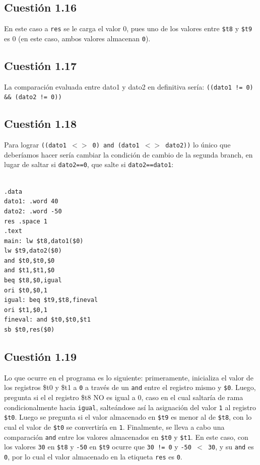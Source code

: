 \documentclass[11pt]{article}
\begin{document}
\begin{large}
\begin{flushleft}
\subsection*{Cuestión 1.16}
En este caso a \texttt{res} se le carga el valor 0, pues uno de los valores entre \texttt{\$t8} y \texttt{\$t9} es 0 (en este caso, ambos valores almacenan \texttt{0}).


\subsection*{Cuestión 1.17}
La comparación evaluada entre dato1 y dato2 en definitiva sería: \texttt{((dato1 != 0) \&\& (dato2 != 0))}

\subsection*{Cuestión 1.18}
Para lograr \texttt{((dato1 $<>$ 0) and (dato1 $<>$ dato2))} lo único que deberíamos hacer sería cambiar la condición de cambio de la segunda branch, en lugar de saltar si \texttt{dato2==0}, que salte si \texttt{dato2==dato1}:

\begin{listing}[h]
\begin{verbatim}

.data
dato1: .word 40
dato2: .word -50
res .space 1
.text
main: lw $t8,dato1($0)
lw $t9,dato2($0)
and $t0,$t0,$0
and $t1,$t1,$0
beq $t8,$0,igual
ori $t0,$0,1
igual: beq $t9,$t8,fineval
ori $t1,$0,1
fineval: and $t0,$t0,$t1
sb $t0,res($0)

\end{verbatim}
\end{listing}

\subsection*{Cuestión 1.19}
Lo que ocurre en el programa es lo siguiente: primeramente, inicializa el valor de los registros \$t0 y \$t1 a \texttt{0} a través de un \texttt{and} entre el registro mismo y \texttt{\$0}. Luego, pregunta si el el registro \$t8 NO es igual a 0, caso en el cual saltaría de rama condicionalmente hacia \texttt{igual}, salteándose así la asignación del valor \texttt{1} al registro \texttt{\$t0}. Luego se pregunta si el valor almacenado en \texttt{\$t9} es menor al de \texttt{\$t8}, con lo cual el valor de \texttt{\$t0} se convertiría en \texttt{1}. Finalmente, se lleva a cabo una comparación \texttt{and} entre los valores almacenados en \texttt{\$t0} y \texttt{\$t1}. En este caso, con los valores \texttt{30} en \texttt{\$t8} y \texttt{-50} en \texttt{\$t9} ocurre que \texttt{30 != 0} y \texttt{-50 $<$ 30}, y su \texttt{and} es \texttt{0}, por lo cual el valor almacenado en la etiqueta \texttt{res} es \texttt{0}.


\end{flushleft}
\end{large}
\end{document}
